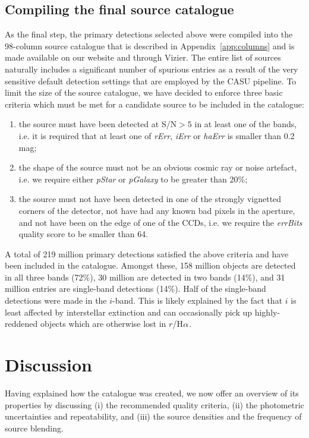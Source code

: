\documentclass[useAMS,usenatbib]{mn2e}
\def\ha{\mbox{H$\rm \alpha$}}
\begin{document}
\subsection{Compiling the final source catalogue}

As the final step, the primary detections
selected above were compiled
into the 98-column source catalogue
that is described in Appendix~\ref{app:columns}
and is made available on our website and through Vizier.
The entire list of sources naturally includes 
a significant number of spurious entries
as a result of the very sensitive default detection settings
that are employed by the CASU pipeline.
To limit the size of the source catalogue,
we have decided to enforce three basic criteria
which must be met for a candidate source
to be included in the catalogue:
\begin{enumerate}
\item the source must have been detected at S/N$>5$ in at least
one of the bands, i.e. it is required that at least one of
\emph{rErr}, \emph{iErr} or \emph{haErr} is smaller
than 0.2 mag;
\item the shape of the source must not be an obvious
cosmic ray or noise artefact, i.e. we require
either \emph{pStar} or \emph{pGalaxy} to be
greater than 20\%;
\item the source must not have been detected in one of the strongly
vignetted corners of the detector, 
not have had any known bad pixels in the aperture,
and not have been on the edge of one of the CCDs,
i.e. we require the \emph{errBits} quality score
to be smaller than 64.
\end{enumerate}

A total of 219 million primary detections satisfied
the above criteria and have been included in the catalogue.
Amongst these, 158 million objects 
are detected in all three bands (72\%),
30 million are detected in two bands (14\%),
and 31 million entries are single-band detections (14\%).
Half of the single-band detections were made in the $i$-band.
This is likely explained by the fact that $i$ is least
affected by interstellar extinction and can occasionally pick up
highly-reddened objects which are otherwise lost in $r$/\ha.

\section{Discussion}
\label{sec:discussion}

Having explained how the catalogue was created,
we now offer an overview of its properties
by discussing  
(i) the recommended quality criteria,
(ii) the photometric uncertainties and repeatability,
and (iii) the source densities and the frequency of source blending.
\end{document}
